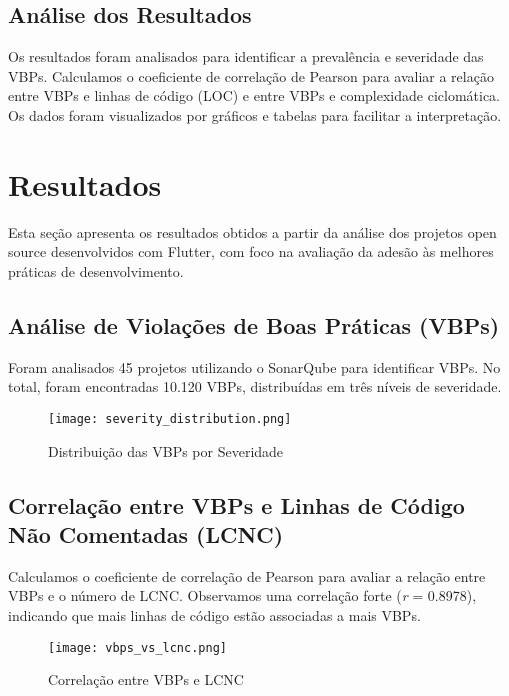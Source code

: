 \documentclass[12pt]{article}
\begin{document}
\subsection{Análise dos Resultados}
Os resultados foram analisados para identificar a prevalência e severidade das VBPs. Calculamos o coeficiente de correlação de Pearson para avaliar a relação entre VBPs e linhas de código (LOC) e entre VBPs e complexidade ciclomática. Os dados foram visualizados por gráficos e tabelas para facilitar a interpretação.

\section{Resultados}

Esta seção apresenta os resultados obtidos a partir da análise dos projetos open source desenvolvidos com Flutter, com foco na avaliação da adesão às melhores práticas de desenvolvimento.

\subsection{Análise de Violações de Boas Práticas (VBPs)}
Foram analisados 45 projetos utilizando o SonarQube para identificar VBPs. No total, foram encontradas 10.120 VBPs, distribuídas em três níveis de severidade.

\begin{figure}[H]
\centering
\texttt{[image: severity\_distribution.png]}
\caption{Distribuição das VBPs por Severidade}
\label{fig:vbps_severity_distribution}
\end{figure}

\subsection{Correlação entre VBPs e Linhas de Código Não Comentadas (LCNC)}
Calculamos o coeficiente de correlação de Pearson para avaliar a relação entre VBPs e o número de LCNC. Observamos uma correlação forte (\textit{r} = 0.8978), indicando que mais linhas de código estão associadas a mais VBPs.

\begin{figure}[H]
\centering
\texttt{[image: vbps\_vs\_lcnc.png]}
\caption{Correlação entre VBPs e LCNC}
\label{fig:vbps_vs_lcnc}
\end{figure}

\end{document}
